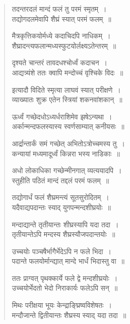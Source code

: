 \documentclass[11pt, openany]{book}
\begin{document}
\begin{quote}
{\qt तदन्तरदलं मान्दं फलं तु परमं स्मृतम्~।\\
तद्योगदलमेवापि शैघ्रं स्यात् परमं फलम्~॥

मैत्रकृत्तिकयोर्मध्ये कदाचिदपि नाधिकम्~।\\
शैघ्रादन्त्यफलान्मध्यस्फुटयोर्लक्ष्यऽतेन्तरम्~॥

दृश्यते चान्तरं तावदधश्चोर्ध्वं कदाचन~।\\
आद्यत्र्यंशे ततः क्वापि मन्दोच्चं वृश्चिके विदः~॥

इत्यादौ विदिते स्मृत्या लाघवं स्यात् परीक्षणे~।\\
व्याख्यातः शुक्र एतेन स्त्रियां शकनवांशकान्~॥

ऊर्ध्वं गच्छेदधोऽध्यर्धराशिमेव झषेऽन्यथा~।\\
अर्कान्मन्दफलस्यास्य स्वर्णसाम्यात् कनीयसः~॥

आर्द्रान्तार्कं समं गच्छेत् अभितोऽत्रोच्चमस्य तु~।\\
कन्यायां मध्यमादूर्ध्वं किन्नरा भस्य नाडिकाः~॥

अधो लोकाधिका गच्छेन्मीनगात् व्यत्ययादपि~।\\
स्तुहीति पठितं मान्दं तद्दलं परमं फलम्~॥

तद्योगार्धं फलं शैघ्रमन्त्यं सूतसुरोदितम्~।\\
यदैवाद्यपदान्तः स्याद् युगपन्मन्दशीघ्रयोः~॥

मन्दाद्यान्ते तृतीयान्तः शीघ्रस्यापि यदा तदा~।\\
तृतीयान्तेऽपि मन्दस्य शैघ्रस्यौजपदान्तयोः~॥

उच्चयोः पञ्चषैर्भागैर्भेदेऽपि न फले भिदा~।\\
पदान्ते फलयोर्मान्द्यात् मान्दे भार्धं भिदास्तु वा~॥

ततः प्राग्वत् पृथक्कार्ये फले द्वे मन्दशीघ्रयोः~।\\
उच्चयोर्भेदतो भेदो निराकार्यः फलेऽपि सन्~॥

मिथः परीक्षया भूयः केन्द्राङ्घ्रिष्वविशेषतः~।\\
मन्दौजान्ते द्वितीयान्तः शैघ्रस्य स्याद् यदा तदा~॥}
\end{quote}
\end{document}
